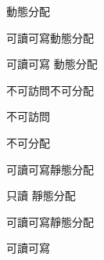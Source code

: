 \bTABLE

\bTABLEhead
\bTR
\bTD \eTD
\bTD{}\eTD \bTD{}\eTD
\bTD{}\eTD \bTD{}\eTD
\eTR
\eTABLEhead

\bTABLEbody
\bTR
\bTD{}\eTD
\bTD 動態分配\par 可讀可寫\eTD \bTD 動態分配\par 可讀可寫\eTD
\bTD 動態分配\par 不可訪問\eTD \bTD 不可分配\par 不可訪問\eTD
\eTR

\bTR
\bTD{}\eTD
\bTD 不可分配\par 可讀可寫\eTD \bTD 靜態分配\par 只讀\eTD
\bTD 靜態分配\par 可讀可寫\eTD \bTD 靜態分配\par 可讀可寫\eTD
\eTR
\eTABLEbody

\eTABLE

